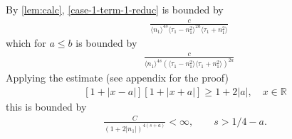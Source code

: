 \documentclass[12pt,reqno]{amsart}
\numberwithin{equation}{section}  %
\numberwithin{figure}{section}
\newcommand{\rr}{\mathbb{R}}
\theoremstyle{plain}
\theoremstyle{definition}
\theoremstyle{remark}
\begin{document}
%
By \autoref{lem:calc}, \eqref{case-1-term-1-reduc} is bounded by
%
%
\begin{equation*}
\begin{split}
  & \frac{c}{\langle n_{1} \rangle ^{4s} \langle \tau_{1} - n_{1}^{2} \rangle
  ^{2a}
  \langle \tau_{1} + n_{1}^{2} \rangle
  }
\end{split}
\end{equation*}
%
%
which for $a \le b$ is bounded by
%
%
\begin{equation*}
\begin{split}
& \frac{c}{\langle n_{1} \rangle ^{4s} (\langle \tau_{1} - n_{1}^{2} \rangle
\langle \tau_{1} + n_{1}^{2} \rangle)^{2a}
  }
\end{split}
\end{equation*}
%
%
Applying the estimate (see appendix for the proof)
%
%
\begin{equation}
  \label{simp-est-lower-bound}
\begin{split}
[1 + |x-a|][1 + |x+a|] \ge 1 + 2|a|, \quad x \in \rr
\end{split}
\end{equation}
%
%
this is bounded by 
%
%
\begin{equation*}
\begin{split}
  \frac{C}{(1 + 2|n_{1}  | ) ^{4(s + a)}} < \infty, \qquad s > 1/4 -a.
\end{split}
\end{equation*}
%
\end{document}
